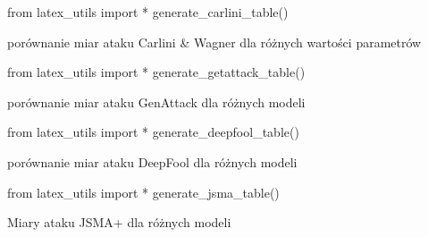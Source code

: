 \documentclass[
    left=2.5cm,         %
    right=2.5cm,        %
    top=2.5cm,          %
    bottom=3cm,         %
    bindingoffset=6mm,  %
    nohyphenation=false %
]{eiti/eiti-thesis}
\begin{document}
\begin{table}[H]
\begin{adjustbox}{max width=\textwidth}
\begin{pycode}
from latex_utils import *
generate_carlini_table()
\end{pycode}
\end{adjustbox}
\caption{porównanie miar ataku Carlini & Wagner dla różnych wartości parametrów}
\end{table}

\begin{table}[H]
\begin{adjustbox}{max width=\textwidth}
\begin{pycode}
from latex_utils import *
generate_getattack_table()
\end{pycode}
\end{adjustbox}
\caption{porównanie miar ataku GenAttack dla różnych modeli}
\end{table}

\begin{table}[H]
\begin{adjustbox}{max width=\textwidth}
\begin{pycode}
from latex_utils import *
generate_deepfool_table()
\end{pycode}
\end{adjustbox}
\caption{porównanie miar ataku DeepFool dla różnych modeli}
\end{table}



\begin{table}[H]
\begin{adjustbox}{max width=\textwidth}
\begin{pycode}
from latex_utils import *
generate_jsma_table()
\end{pycode}
\end{adjustbox}
\caption{Miary ataku JSMA+ dla różnych modeli}
\end{table}




\end{document}
